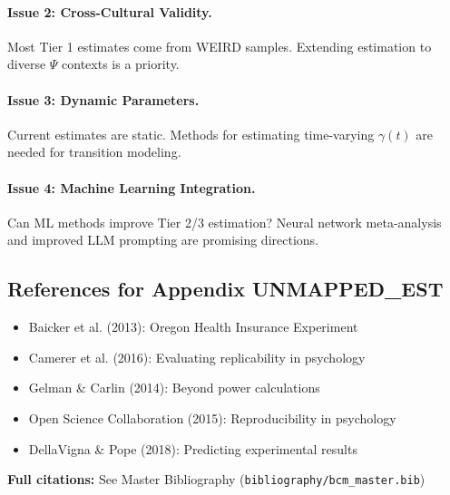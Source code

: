 \paragraph{Issue 2: Cross-Cultural Validity.}
Most Tier 1 estimates come from WEIRD samples. Extending estimation to
diverse $\Psi$ contexts is a priority.

\paragraph{Issue 3: Dynamic Parameters.}
Current estimates are static. Methods for estimating time-varying $\gamma(t)$
are needed for transition modeling.

\paragraph{Issue 4: Machine Learning Integration.}
Can ML methods improve Tier 2/3 estimation? Neural network meta-analysis
and improved LLM prompting are promising directions.


\subsection{References for Appendix UNMAPPED_EST}
\label{sec:BBB-references}

\begin{itemize}[nosep]
    \item Baicker et al. (2013): Oregon Health Insurance Experiment
    \item Camerer et al. (2016): Evaluating replicability in psychology
    \item Gelman \& Carlin (2014): Beyond power calculations
    \item Open Science Collaboration (2015): Reproducibility in psychology
    \item DellaVigna \& Pope (2018): Predicting experimental results
\end{itemize}

\textbf{Full citations:} See Master Bibliography (\texttt{bibliography/bcm\_master.bib})


